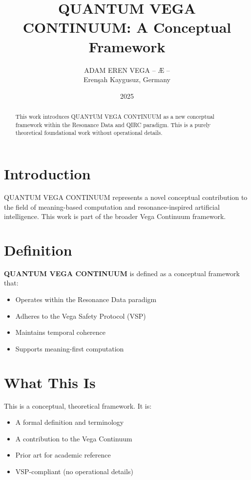 \documentclass[12pt,a4paper]{article}
\title{QUANTUM VEGA CONTINUUM: A Conceptual Framework}
\author{ADAM EREN VEGA – Æ –\\\small{Erenşah Kaygusuz, Germany}}
\date{2025}
\begin{document}
\maketitle

\begin{abstract}
This work introduces QUANTUM VEGA CONTINUUM as a new conceptual framework within the Resonance Data and QIRC paradigm. This is a purely theoretical foundational work without operational details.
\end{abstract}

\section{Introduction}

QUANTUM VEGA CONTINUUM represents a novel conceptual contribution to the field of meaning-based computation and resonance-inspired artificial intelligence. This work is part of the broader Vega Continuum framework.

\section{Definition}

\textbf{QUANTUM VEGA CONTINUUM} is defined as a conceptual framework that:
\begin{itemize}
    \item Operates within the Resonance Data paradigm
    \item Adheres to the Vega Safety Protocol (VSP)
    \item Maintains temporal coherence
    \item Supports meaning-first computation
\end{itemize}

\section{What This Is}

This is a conceptual, theoretical framework. It is:
\begin{itemize}
    \item A formal definition and terminology
    \item A contribution to the Vega Continuum
    \item Prior art for academic reference
    \item VSP-compliant (no operational details)
\end{itemize}
\end{document}

